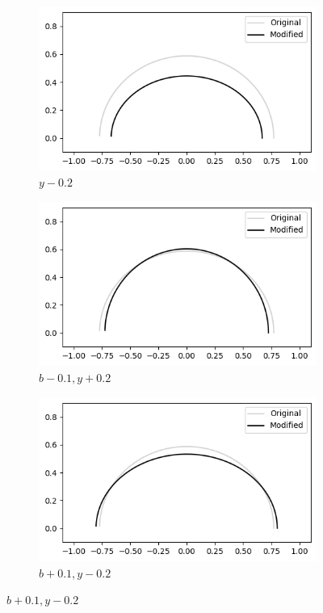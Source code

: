 \documentclass[a4paper]{report}
\begin{document}
\begin{figure}[H]
      \medskip

    \begin{subfigure}{.3\linewidth}
        \includegraphics[width=\linewidth]{images/deformations/lower_y.png}
        \caption{$y - 0.2$}
        \label{fig:lower_y}
      \end{subfigure}\hfill
      \begin{subfigure}{.3\linewidth}
        \includegraphics[width=\linewidth]{images/deformations/mixing_b_y.png}
        \caption{$b - 0.1, y + 0.2$}
        \label{fig:mixing_b_y}
      \end{subfigure}\hfill
      \begin{subfigure}{.3\linewidth}
        \includegraphics[width=\linewidth]{images/deformations/mixing_b_y_v2.png}
        \caption{$b + 0.1, y - 0.2$}
        \label{fig:mixing_b_y_v2}
      \end{subfigure}
    

\end{figure}
\end{document}
